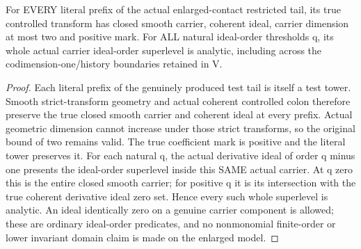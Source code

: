 \begin{theorem}
\label{hir:zero-contact-all-prefix-coherent-order-predicates}
For EVERY literal prefix of the actual enlarged-contact restricted tail,
its true controlled transform has closed smooth carrier, coherent ideal,
carrier dimension at most two and positive mark. For ALL natural ideal-order
thresholds q, its whole actual carrier ideal-order superlevel is analytic,
including across the codimension-one/history boundaries retained in V.
\end{theorem}
\leanok
\begin{proof}
Each literal prefix of the genuinely produced test tail is itself a test
tower. Smooth strict-transform geometry and actual coherent controlled colon
therefore preserve the true closed smooth carrier and coherent ideal at
every prefix. Actual geometric dimension cannot increase under those strict
transforms, so the original bound of two remains valid. The true coefficient
mark is positive and the literal tower preserves it. For each natural q,
the actual derivative ideal of order q minus one presents the ideal-order
superlevel inside this SAME actual carrier. At q zero this is the entire
closed smooth carrier; for positive q it is its intersection with the true
coherent derivative ideal zero set. Hence every such whole superlevel is
analytic. An ideal identically zero on a genuine carrier component is allowed;
these are ordinary ideal-order predicates, and no nonmonomial finite-order
or lower invariant domain claim is made on the enlarged model.
\end{proof}

